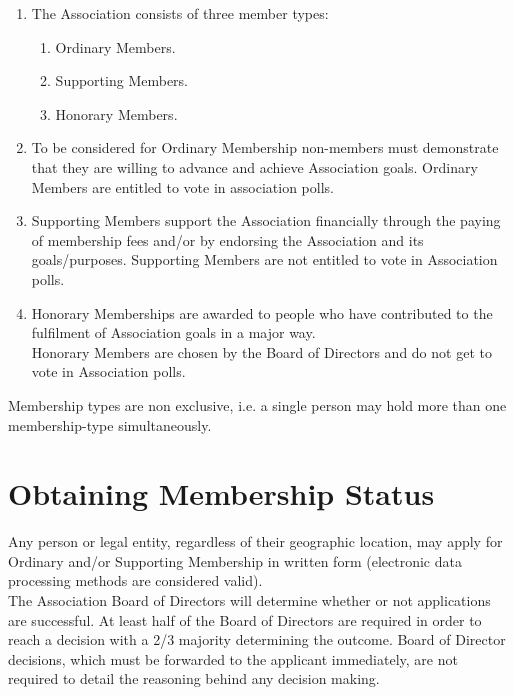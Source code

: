 \begin{enumerate}
\item The Association consists of three member types:

\begin{enumerate}
\item Ordinary Members.
\item Supporting Members.
\item Honorary Members.

\end{enumerate}
\item To be considered for Ordinary Membership non-members must demonstrate that they are willing to advance and achieve Association goals. Ordinary Members are entitled to vote in association polls.
\item Supporting Members support the Association financially through the paying of membership fees and/or by endorsing the Association and its goals/purposes. Supporting Members are not entitled to vote in Association polls.
\item Honorary Memberships are awarded to people who have contributed to the fulfilment of Association goals in a major way.\\ Honorary Members are chosen by the Board of Directors and do not get to vote in Association polls.

\end{enumerate}

Membership types are non exclusive, i.e. a single person may hold more than one membership-type simultaneously.\\





\section{Obtaining Membership Status}

Any person or legal entity, regardless of their geographic location, may apply for Ordinary and/or Supporting Membership in written form (electronic data processing methods are considered valid).\\

The Association Board of Directors will determine whether or not applications are successful. At least half of the Board of Directors are required in order to reach a decision with a 2/3 majority determining the outcome. Board of Director decisions, which must be forwarded to the applicant immediately, are not required to detail the reasoning behind any decision making.\\




